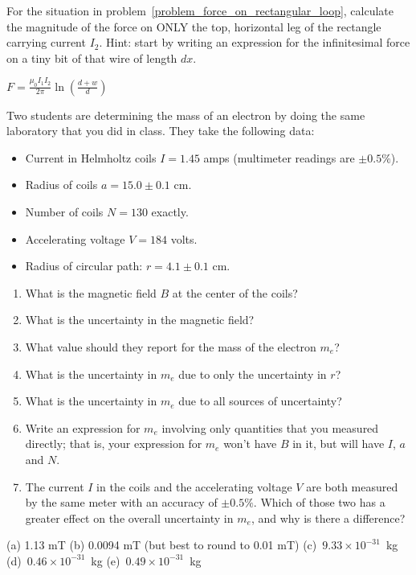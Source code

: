 \begin{Exercise}
For the situation in problem~\ref{problem_force_on_rectangular_loop}, calculate the magnitude of the force on ONLY the top, horizontal leg of the rectangle carrying current $I_2$.  Hint: start by writing an expression for the infinitesimal force on a tiny bit of that wire of length $dx$. 
\end{Exercise}
\begin{Answer}
$\displaystyle F = \frac{\mu_0 I_1 I_2}{2\pi} \ln \left( \frac{d+w}{d} \right)$
\end{Answer}

\begin{Exercise}
Two students are determining the mass of an electron by doing the same laboratory that you did in class.  They take the following data:
\begin{itemize}[nosep]
\item Current in Helmholtz coils $I=1.45$ amps (multimeter readings are $\pm 0.5\%$).
\item Radius of coils $a=15.0\pm 0.1$ cm.
\item Number of coils $N=130$ exactly.
\item Accelerating voltage $V=184$ volts.
\item Radius of circular path: $r=4.1\pm 0.1$ cm.
\end{itemize}
\begin{enumerate}
\item What is the magnetic field $B$ at the center of the coils?  
\item What is the uncertainty in the magnetic field?  
\item What value should they report for the mass of the electron $m_e$?  
\item What is the uncertainty in $m_e$ due to only the uncertainty in $r$? 
\item What is the uncertainty in $m_e$ due to all sources of uncertainty?  
\item Write an expression for $m_e$ involving only quantities that you measured directly; that is, your expression for $m_e$ won't have $B$ in it, but will have $I$, $a$ and $N$.  
\item The current $I$ in the coils and the accelerating voltage $V$ are both measured by the same meter with an accuracy of $\pm 0.5\%$.  Which of those two has a greater effect on the overall uncertainty in $m_e$, and why is there a difference?
\end{enumerate}
\end{Exercise}
\begin{Answer}
(a) 1.13 mT 
(b) 0.0094 mT (but best to round to 0.01 mT) 
(c)~$9.33 \times 10^{-31}$~kg 
(d)~$0.46 \times 10^{-31}$~kg 
(e)~$0.49 \times 10^{-31}$~kg
\end{Answer}


